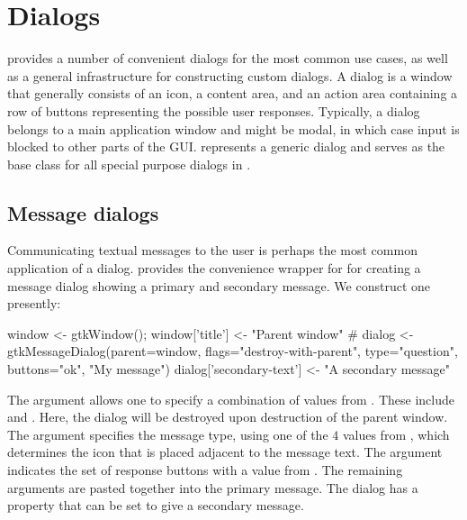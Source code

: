 \section{Dialogs}
\label{sec:dialogs}

\GTK\/ provides a number of convenient dialogs for the most common use
cases, as well as a general infrastructure for constructing custom
dialogs.  A dialog is a window that generally consists of an icon, a
content area, and an action area containing a row of buttons
representing the possible user responses.  Typically, a dialog belongs
to a main application window and might be modal, in which case input
is blocked to other parts of the GUI.  
represents a generic dialog and serves as the base class for all
special purpose dialogs in \GTK.


\subsection{Message dialogs}
\label{sec:gtk-dialog-message}

Communicating textual messages to the user is perhaps the most common
application of a dialog. \GTK\/ provides the
 convenience wrapper for
 for creating a message dialog showing a primary and
secondary message.  We construct one presently:
\begin{Schunk}
\begin{Sinput}
 window <- gtkWindow(); window['title'] <- "Parent window"
 #
 dialog <- gtkMessageDialog(parent=window, 
                            flags="destroy-with-parent",
                            type="question", 
                            buttons="ok",
                            "My message")
 dialog['secondary-text'] <- "A secondary message"
\end{Sinput}
\end{Schunk}
%

The  argument allows one to specify
a combination of values from . These include
 and . Here, the dialog will be
destroyed upon destruction of the parent window. The
 argument specifies the message type,
using one of the $4$ values from , which
determines the icon that is placed adjacent to the message text. The
 argument indicates the set of
response buttons with a value from . The
remaining arguments are pasted together into the primary message.  The
dialog has a  property that can be set to give a
secondary message.

